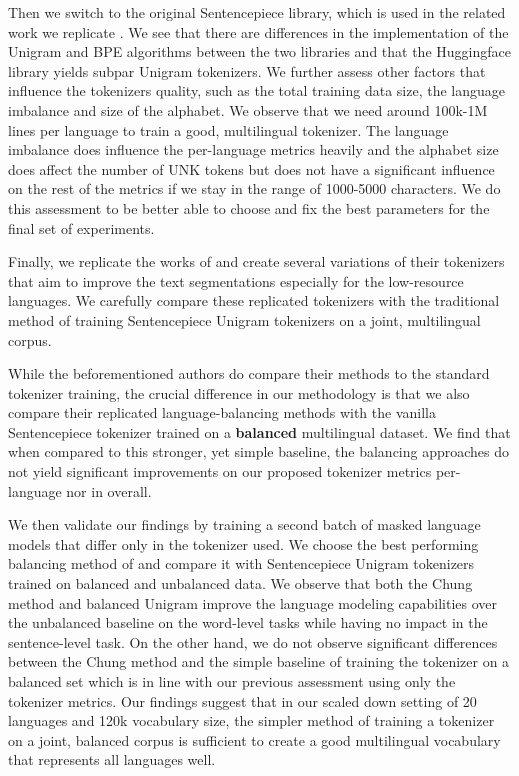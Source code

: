 Then we switch to the original Sentencepiece library, which is used in the related work we replicate \cite{conneau_unsupervised_2020,chung_improving_2020,zheng_allocating_2021,liang_xlm-v_2023}. We see that there are differences in the implementation of the Unigram and BPE algorithms between the two libraries and that the Huggingface library yields subpar Unigram tokenizers. We further assess other factors that influence the tokenizers quality, such as the total training data size, the language imbalance and size of the alphabet. We observe that we need around 100k-1M lines per language to train a good, multilingual tokenizer. The language imbalance does influence the per-language metrics heavily and the alphabet size does affect the number of UNK tokens but does not have a significant influence on the rest of the metrics if we stay in the range of 1000-5000 characters. We do this assessment to be better able to choose and fix the best parameters for the final set of experiments.

Finally, we replicate the works of \citet{chung_improving_2020,zheng_allocating_2021,liang_xlm-v_2023} and create several variations of their tokenizers that aim to improve the text segmentations especially for the low-resource languages. We carefully compare these replicated tokenizers with the traditional method of training Sentencepiece Unigram tokenizers on a joint, multilingual corpus. 

While the beforementioned authors do compare their methods to the standard tokenizer training, the crucial difference in our methodology is that we also compare their replicated language-balancing methods with the vanilla Sentencepiece tokenizer trained on a \textbf{balanced} multilingual dataset. We find that when compared to this stronger, yet simple baseline, the balancing approaches do not yield significant improvements on our proposed tokenizer metrics per-language nor in overall.

We then validate our findings by training a second batch of masked language models that differ only in the tokenizer used. We choose the best performing balancing method of \citet{chung_improving_2020} and compare it with Sentencepiece Unigram tokenizers trained on balanced and unbalanced data. We observe that both the Chung method and balanced Unigram improve the language modeling capabilities over the unbalanced baseline on the word-level tasks while having no impact in the sentence-level task. On the other hand, we do not observe significant differences between the Chung method and the simple baseline of training the tokenizer on a balanced set which is in line with our previous assessment using only the tokenizer metrics. Our findings suggest that in our scaled down setting of 20 languages and 120k vocabulary size, the simpler method of training a tokenizer on a joint, balanced corpus is sufficient to create a good multilingual vocabulary that represents all languages well.

